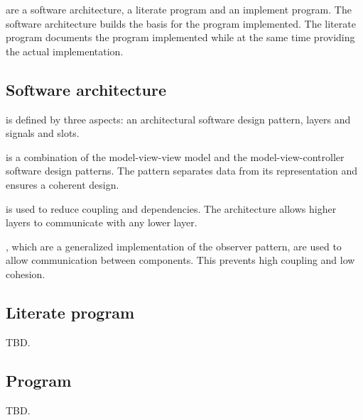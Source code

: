 \documentclass[%
    a4paper,    %
    justified,  %
    nobib,      %
    openany     %
]{tufte-book}
\makeatletter
\renewcommand{\label}[1]{\@tufte@label{##1}}%
\makeatother
\begin{document}

 are a software architecture, a literate
program and an implement program. The software architecture builds the basis for
the program implemented. The literate program documents the program implemented
while at the same time providing the actual implementation.

\subsection{Software architecture}
\label{subsec:discussion-conclusion:discussion:software-architecture}

 is defined by three aspects: an
architectural software design pattern, layers and signals and slots.

 is a combination of
the model-view-view model and the model-view-controller software design
patterns. The pattern separates data from its representation and ensures a
coherent design.

 is used to reduce coupling and
dependencies. The architecture allows higher layers to communicate with any
lower layer.

, which are a generalized implementation of the
observer pattern, are used to allow communication between components. This
prevents high coupling and low cohesion.

\subsection{Literate program}
\label{subsec:discussion-conclusion:discussion:literate-program}

TBD.

\subsection{Program}
\label{subsec:discussion-conclusion:discussion:program}

TBD.
\end{document}
